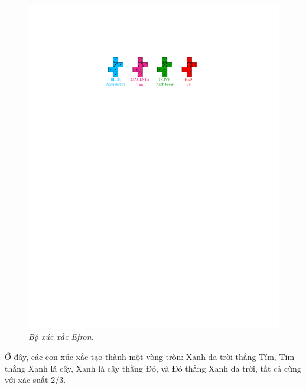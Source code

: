 \begin{multicols}{2}
\begin{figure}[H]
		\includegraphics[width=1\linewidth]{6}
		\caption{\small\textit{\color{quantoan}Bộ xúc xắc Efron.}}
		\vspace*{-10pt}
	\end{figure}
	Ở đây, các con xúc xắc tạo thành một vòng tròn: Xanh da trời thắng Tím, Tím thắng Xanh lá cây, Xanh lá cây thắng Đỏ, và Đỏ thắng Xanh da trời, tất cả cùng với xác suất $2/3$.
	\begin{figure}[H]
		\vspace*{-10pt}
		\centering
		\captionsetup{labelformat= empty, justification=centering}

\end{figure}
\end{multicols}

